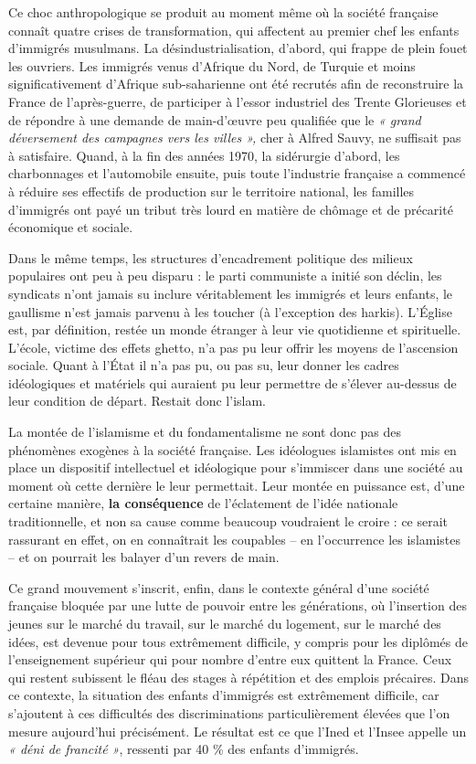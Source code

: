 Ce choc anthropologique se produit au moment même où la société
française connaît quatre crises de transformation, qui affectent au
premier chef les enfants d'immigrés musulmans. La désindustrialisation,
d'abord, qui frappe de plein fouet les ouvriers. Les immigrés venus
d'Afrique du Nord, de Turquie et moins significativement d'Afrique
sub-saharienne ont été recrutés afin de reconstruire la France de
l'après-guerre, de participer à l'essor industriel des Trente Glorieuses
et de répondre à une demande de main-d'œuvre peu qualifiée que le
\emph{« grand déversement des campagnes vers les villes »,} cher à
Alfred Sauvy, ne suffisait pas à satisfaire. Quand, à la fin des années
1970, la sidérurgie d'abord, les charbonnages et l'automobile ensuite,
puis toute l'industrie française a commencé à réduire ses effectifs de
production sur le territoire national, les familles d'immigrés ont payé
un tribut très lourd en matière de chômage et de précarité économique et
sociale.

Dans le même temps, les structures d'encadrement politique des milieux
populaires ont peu à peu disparu : le parti communiste a initié son
déclin, les syndicats n'ont jamais su inclure véritablement les immigrés
et leurs enfants, le gaullisme n'est jamais parvenu à les toucher (à
l'exception des harkis). L'Église est, par définition, restée un monde
étranger à leur vie quotidienne et spirituelle. L'école, victime des
effets ghetto, n'a pas pu leur offrir les moyens de l'ascension sociale.
Quant à l'État il n'a pas pu, ou pas su, leur donner les cadres
idéologiques et matériels qui auraient pu leur permettre de s'élever
au-dessus de leur condition de départ. Restait donc l'islam.



La montée de l'islamisme et du fondamentalisme ne sont donc pas des
phénomènes exogènes à la société française. Les idéologues islamistes
ont mis en place un dispositif intellectuel et idéologique pour
s'immiscer dans une société au moment où cette dernière le leur
permettait. Leur montée en puissance est, d'une certaine manière,
\textbf{la conséquence} de l'éclatement de l'idée nationale
traditionnelle, et non sa cause comme beaucoup voudraient le croire : ce
serait rassurant en effet, on en connaîtrait les coupables -- en
l'occurrence les islamistes -- et on pourrait les balayer d'un revers de
main.

Ce grand mouvement s'inscrit, enfin, dans le contexte général d'une
société française bloquée par une lutte de pouvoir entre les
générations, où l'insertion des jeunes sur le marché du travail, sur le
marché du logement, sur le marché des idées, est devenue pour tous
extrêmement difficile, y compris pour les diplômés de l'enseignement
supérieur qui pour nombre d'entre eux quittent la France. Ceux qui
restent subissent le fléau des stages à répétition et des emplois
précaires. Dans ce contexte, la situation des enfants d'immigrés est
extrêmement difficile, car s'ajoutent à ces difficultés des
discriminations particulièrement élevées que l'on mesure aujourd'hui
précisément. Le résultat est ce que l'Ined et l'Insee appelle un
\emph{« déni de francité »}, ressenti par 40 \% des enfants d'immigrés.

